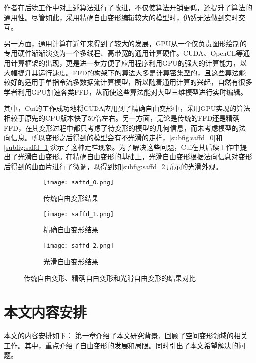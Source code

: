 作者在后续工作\cite{Feng00, Feng02}中对上述算法进行了改进，不仅使算法开销更低，还提升了算法的通用性。尽管如此，采用精确自由变形编辑较大的模型时，仍然无法做到实时交互。

另一方面，通用计算在近年来得到了较大的发展，GPU从一个仅负责图形绘制的专用硬件渐渐演变为一个多线程、高带宽的通用计算硬件。CUDA、OpenCL等通用计算框架的出现，更是进一步方便了应用程序利用GPU的强大的计算能力，以大幅提升其运行速度。FFD的构架下的算法大多是计算密集型的，且这些算法能较好的适用于单指令流多数据流计算模型，所以随着通用计算的兴起，自然有很多学者利用GPU加速各类FFD，从而使这些算法能对大型三维模型进行实时编辑。

其中，Cui\cite{Cui13}的工作成功地将CUDA应用到了精确自由变形中，采用GPU实现的算法相较于原先的CPU版本快了50倍左右。另一方面，无论是传统的FFD还是精确FFD，在其变形过程中都只考虑了待变形的模型的几何信息，而未考虑模型的法向信息。所以变形之后得到的模型会有不光滑的走样，\autoref{subfig:saffd_0}和\autoref{subfig:saffd_1}演示了这种走样现象。为了解决这些问题，Cui在其后续工作\cite{Cui15}中提出了光滑自由变形。在精确自由变形的基础上，光滑自由变形根据法向信息对变形后得到的曲面片进行了微调，以得到如\autoref{subfig:saffd_2}所示的光滑外观。

\begin{figure}[htbp]
	\centering
	\begin{subfigure}[b]{.3\textwidth}
		\centering
		\texttt{[image: saffd\_0.png]}
		\caption{传统自由变形结果}\label{subfig:saffd_0}
	\end{subfigure}
	\quad
	\begin{subfigure}[b]{.3\textwidth}
		\centering
		\texttt{[image: saffd\_1.png]}
		\caption{精确自由变形结果}\label{subfig:saffd_1}
	\end{subfigure}
	\quad
	\begin{subfigure}[b]{.3\textwidth}
		\centering
		\texttt{[image: saffd\_2.png]}
		\caption{光滑自由变形结果}\label{subfig:saffd_2}
	\end{subfigure}
    \caption{传统自由变形、精确自由变形和光滑自由变形的结果对比}\label{fig:sample_problem_saffd}
\end{figure}




\section{本文内容安排}
本文的内容安排如下：
第一章介绍了本文研究背景，回顾了空间变形领域的相关工作。其中，重点介绍了自由变形的发展和局限。同时引出了本文希望解决的问题。

